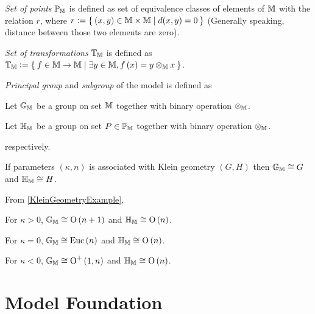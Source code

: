 \documentclass[stu, babel, american, biblatex, a4paper, draftall]{apa7}
\begin{document}
\begin{definition}\label{SetOfPoints}
    \textit{Set of points} $\mathbb{P}_{\mathbb{M}}$ is defined as set of equivalence classes of elements of $\mathbb{M}$ with the relation $r$,
    where $r\vcentcolon=\Set{\left(x,y\right)\in\mathbb{M}\times\mathbb{M}|d(x,y)=0}$
    (Generally speaking, distance between those two elements are zero).
\end{definition}
\begin{definition}\label{SetOfTransformations}
    \textit{Set of transformations} $\mathbb{T}_{\mathbb{M}}$ is defined as
    $\mathbb{T}_{\mathbb{M}}\vcentcolon=\Set{f\in\mathbb{M}\to\mathbb{M}|\exists y \in\mathbb{M}, f\left(x\right) = y \otimes_{\mathbb{M}} x}$.
\end{definition}
\begin{definition}\label{ModelGroup}
    \textit{Principal group} and \textit{subgroup} of the model is defined as
    \begin{APAitemize}
        \item Let $\mathbb{G}_{\mathbb{M}}$ be a group on set $\mathbb{M}$ together with binary operation $\otimes_{\mathbb{M}}$.
        \item Let $\mathbb{H}_{\mathbb{M}}$ be a group on set $P\in\mathbb{P}_{\mathbb{M}}$ together with binary operation $\otimes_{\mathbb{M}}$.
    \end{APAitemize}
    respectively.
\end{definition}
\begin{conjecture}\label{GeometricGroupStructure}
    If parameters $\left(\kappa,n\right)$ is associated with Klein geometry $\left(G,H\right)$
    then $\mathbb{G}_{\mathbb{M}}\cong G$ and $\mathbb{H}_{\mathbb{M}}\cong H$.

    From \cref{KleinGeometryExample},
    \begin{APAitemize}
        \item For $\kappa>0$, $\mathbb{G}_{\mathbb{M}}\cong\operatorname{O}\left(n+1\right)$ and $\mathbb{H}_{\mathbb{M}}\cong\operatorname{O}\left(n\right)$.
        \item For $\kappa=0$, $\mathbb{G}_{\mathbb{M}}\cong\operatorname{Euc}\left(n\right)$ and $\mathbb{H}_{\mathbb{M}}\cong\operatorname{O}\left(n\right)$.
        \item For $\kappa<0$, $\mathbb{G}_{\mathbb{M}}\cong\operatorname{O}^{+}\left(1,n\right)$ and $\mathbb{H}_{\mathbb{M}}\cong\operatorname{O}\left(n\right)$.
    \end{APAitemize}
\end{conjecture}
\section{Model Foundation}
\end{document}
